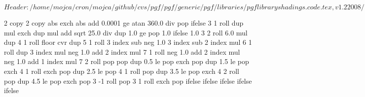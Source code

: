 %
%
%

\ProvidesFileRCS[v\pgfversion] $Header: /home/mojca/cron/mojca/github/cvs/pgf/pgf/generic/pgf/libraries/pgflibraryshadings.code.tex,v 1.2 2008/10/29 23:06:34 tantau Exp $


%
%

{\pgfpoint{-50bp}{-50bp}}
{\pgfpoint{50bp}{50bp}}
{}
{ %
  2 copy %
  2 copy abs exch abs add 0.0001 ge 
  {atan 360.0 div} %
  { pop } %
  ifelse  %
  3 1 roll %
  dup mul %
  exch dup mul %
  add sqrt %
  25.0 div %
  dup 1.0 ge %
  { pop 1.0 }{} ifelse %
  1.0 %
  3 2 roll 6.0 mul dup 4 1 roll %
  floor cvr  %
  dup 5 1 roll %
  3 index sub neg %
  1.0 3 index sub %
  2 index mul %
  6 1 roll %
  dup 3 index mul neg 1.0 add %
  2 index mul %
  7 1 roll %
  neg 1.0 add %
  2 index mul neg 1.0  add %
  1 index mul %
  7 2 roll %
  pop pop %
  dup 0.5 le %
  { %
    pop exch pop
  }
  { dup 1.5 le %
    { %
      pop exch 4 1 roll exch pop
    }
    { dup 2.5 le %
      { %
        pop 4 1 roll pop
      }
      { dup 3.5 le %
        { %
          pop exch 4 2 roll pop
        }
        { dup 4.5 le %
          { %
            pop exch pop 3 -1 roll
          }
          { %
            pop 3 1 roll exch pop
          }
          ifelse
        }
        ifelse %
      }
      ifelse %
    }
    ifelse %
  }
  ifelse %
}

